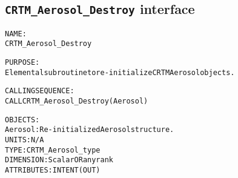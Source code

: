\subsection{\texttt{CRTM\_Aerosol\_Destroy} interface}
  \label{sec:CRTM_Aerosol_Destroy_interface}
  \begin{alltt}
 
  NAME:
        CRTM_Aerosol_Destroy
 
  PURPOSE:
        Elemental subroutine to re-initialize CRTM Aerosol objects.
 
  CALLING SEQUENCE:
        CALL CRTM_Aerosol_Destroy( Aerosol )
 
  OBJECTS:
        Aerosol:      Re-initialized Aerosol structure.
                      UNITS:      N/A
                      TYPE:       CRTM_Aerosol_type
                      DIMENSION:  Scalar OR any rank
                      ATTRIBUTES: INTENT(OUT)
 
  \end{alltt}

